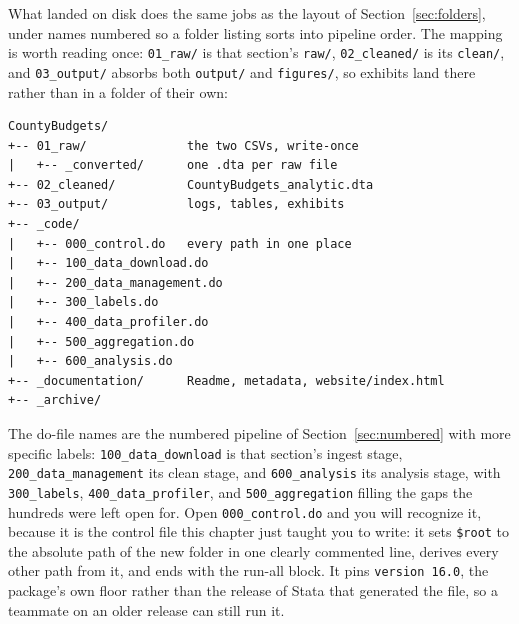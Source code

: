 What landed on disk does the same jobs as the layout of Section~\ref{sec:folders}, under names numbered so a folder listing sorts into pipeline order. The mapping is worth reading once: \texttt{01\_raw/} is that section's \texttt{raw/}, \texttt{02\_cleaned/} is its \texttt{clean/}, and \texttt{03\_output/} absorbs both \texttt{output/} and \texttt{figures/}, so exhibits land there rather than in a folder of their own:
\par
{\footnotesize
\begin{verbatim}
CountyBudgets/
+-- 01_raw/              the two CSVs, write-once
|   +-- _converted/      one .dta per raw file
+-- 02_cleaned/          CountyBudgets_analytic.dta
+-- 03_output/           logs, tables, exhibits
+-- _code/
|   +-- 000_control.do   every path in one place
|   +-- 100_data_download.do
|   +-- 200_data_management.do
|   +-- 300_labels.do
|   +-- 400_data_profiler.do
|   +-- 500_aggregation.do
|   +-- 600_analysis.do
+-- _documentation/      Readme, metadata, website/index.html
+-- _archive/
\end{verbatim}
}
The do-file names are the numbered pipeline of Section~\ref{sec:numbered} with more specific labels: \texttt{100\_data\_download} is that section's ingest stage, \texttt{200\_data\_management} its clean stage, and \texttt{600\_analysis} its analysis stage, with \texttt{300\_labels}, \texttt{400\_data\_profiler}, and \texttt{500\_aggregation} filling the gaps the hundreds were left open for. Open \texttt{000\_control.do} and you will recognize it, because it is the control file this chapter just taught you to write: it sets \texttt{\$root} to the absolute path of the new folder in one clearly commented line, derives every other path from it, and ends with the run-all block. It pins \texttt{version 16.0}, the package's own floor rather than the release of Stata that generated the file, so a teammate on an older release can still run it.

